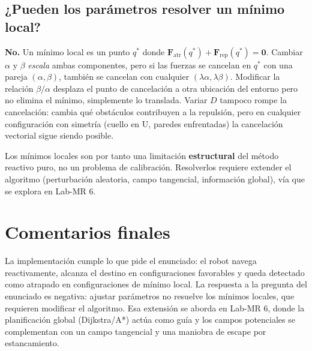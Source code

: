 \subsection{¿Pueden los par\'{a}metros resolver un m\'{i}nimo local?}
\textbf{No.} Un m\'{i}nimo local es un punto $q^*$ donde $\mathbf{F}_\text{atr}(q^*) + \mathbf{F}_\text{rep}(q^*) = \mathbf{0}$. Cambiar $\alpha$ y $\beta$ \emph{escala} ambas componentes, pero si las fuerzas se cancelan en $q^*$ con una pareja $(\alpha, \beta)$, tambi\'{e}n se cancelan con cualquier $(\lambda\alpha, \lambda\beta)$. Modificar la relaci\'{o}n $\beta/\alpha$ desplaza el punto de cancelaci\'{o}n a otra ubicaci\'{o}n del entorno pero no elimina el m\'{i}nimo, simplemente lo translada. Variar $D$ tampoco rompe la cancelaci\'{o}n: cambia qu\'{e} obst\'{a}culos contribuyen a la repulsi\'{o}n, pero en cualquier configuraci\'{o}n con simetr\'{i}a (cuello en \textsf{U}, paredes enfrentadas) la cancelaci\'{o}n vectorial sigue siendo posible.

Los m\'{i}nimos locales son por tanto una limitaci\'{o}n \textbf{estructural} del m\'{e}todo reactivo puro, no un problema de calibraci\'{o}n. Resolverlos requiere extender el algoritmo (perturbaci\'{o}n aleatoria, campo tangencial, informaci\'{o}n global), v\'{i}a que se explora en Lab-MR 6.


\section{Comentarios finales}

La implementaci\'{o}n cumple lo que pide el enunciado: el robot navega reactivamente, alcanza el destino en configuraciones favorables y queda detectado como atrapado en configuraciones de m\'{i}nimo local. La respuesta a la pregunta del enunciado es negativa: ajustar par\'{a}metros no resuelve los m\'{i}nimos locales, que requieren modificar el algoritmo. Esa extensi\'{o}n se aborda en Lab-MR 6, donde la planificaci\'{o}n global (Dijkstra/A*) act\'{u}a como gu\'{i}a y los campos potenciales se complementan con un campo tangencial y una maniobra de escape por estancamiento.
